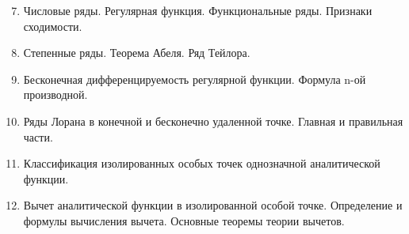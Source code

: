\begin{enumerate}
    \setcounter{enumi}{6}

    \item Числовые ряды. Регулярная функция. Функциональные ряды. Признаки сходимости.
    \item Степенные ряды. Теорема Абеля. Ряд Тейлора.
    \item Бесконечная дифференцируемость регулярной функции. Формула n-ой производной.
    \item Ряды Лорана в конечной и бесконечно удаленной точке. Главная и правильная части.
    \item Классификация изолированных особых точек однозначной аналитической функции.
    \item Вычет аналитической функции в изолированной особой точке. Определение и формулы вычисления вычета. Основные теоремы теории вычетов.
\end{enumerate}